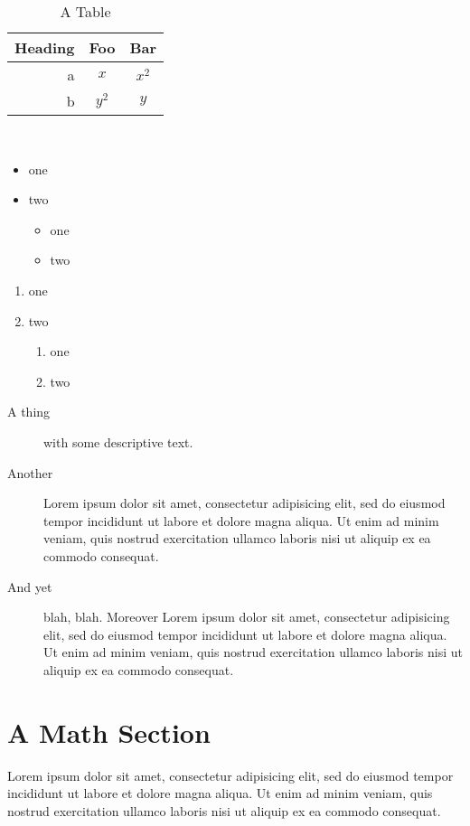 \documentclass{amsart}
\theoremstyle{definition}
\theoremstyle{remark}
\numberwithin{equation}{section}
\begin{document}
\begin{table}
\begin{centering}
\begin{tabular}{r|cc}
Heading & Foo & Bar\\\hline
a & $x$ & $x^2$\\
b & $y^2$ & $y$\\
\end{tabular}\\
\end{centering}
\caption{A Table}
\end{table}

\begin{itemize}
 \item one
 \item two
   \begin{itemize}
    \item one
    \item two
   \end{itemize}
\end{itemize}

\begin{enumerate}
 \item one
 \item two
   \begin{enumerate}
    \item one
    \item two
   \end{enumerate}
\end{enumerate}

\begin{description}
\item[A thing] with some descriptive text.
\item[Another] Lorem ipsum dolor sit amet, consectetur adipisicing elit, sed do eiusmod tempor incididunt ut labore et dolore magna aliqua. Ut enim ad minim veniam, quis nostrud exercitation ullamco laboris nisi ut aliquip ex ea commodo consequat. 
\item[And yet] blah, blah. Moreover
Lorem ipsum dolor sit amet, consectetur adipisicing elit, sed do eiusmod tempor incididunt ut labore et dolore magna aliqua. Ut enim ad minim veniam, quis nostrud exercitation ullamco laboris nisi ut aliquip ex ea commodo consequat. 
\end{description}

\section{A Math Section}
Lorem ipsum dolor sit amet, consectetur adipisicing elit, sed do eiusmod tempor incididunt ut labore et dolore magna aliqua. Ut enim ad minim veniam, quis nostrud exercitation ullamco laboris nisi ut aliquip ex ea commodo consequat.
\end{document}
